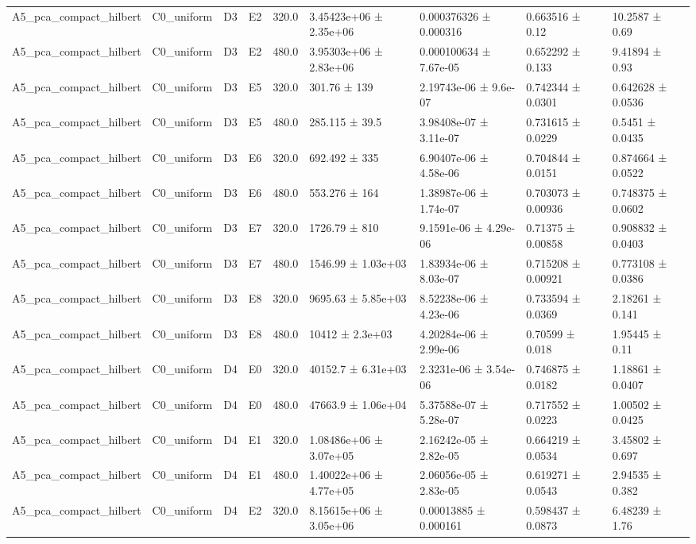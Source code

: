 \begin{table}
\begin{tabular}{lllllllll}
A5\_pca\_compact\_hilbert & C0\_uniform & D3 & E2 & 320.0 & 3.45423e+06 ± 2.35e+06 & 0.000376326 ± 0.000316 & 0.663516 ± 0.12 & 10.2587 ± 0.69 \\
A5\_pca\_compact\_hilbert & C0\_uniform & D3 & E2 & 480.0 & 3.95303e+06 ± 2.83e+06 & 0.000100634 ± 7.67e-05 & 0.652292 ± 0.133 & 9.41894 ± 0.93 \\
A5\_pca\_compact\_hilbert & C0\_uniform & D3 & E5 & 320.0 & 301.76 ± 139 & 2.19743e-06 ± 9.6e-07 & 0.742344 ± 0.0301 & 0.642628 ± 0.0536 \\
A5\_pca\_compact\_hilbert & C0\_uniform & D3 & E5 & 480.0 & 285.115 ± 39.5 & 3.98408e-07 ± 3.11e-07 & 0.731615 ± 0.0229 & 0.5451 ± 0.0435 \\
A5\_pca\_compact\_hilbert & C0\_uniform & D3 & E6 & 320.0 & 692.492 ± 335 & 6.90407e-06 ± 4.58e-06 & 0.704844 ± 0.0151 & 0.874664 ± 0.0522 \\
A5\_pca\_compact\_hilbert & C0\_uniform & D3 & E6 & 480.0 & 553.276 ± 164 & 1.38987e-06 ± 1.74e-07 & 0.703073 ± 0.00936 & 0.748375 ± 0.0602 \\
A5\_pca\_compact\_hilbert & C0\_uniform & D3 & E7 & 320.0 & 1726.79 ± 810 & 9.1591e-06 ± 4.29e-06 & 0.71375 ± 0.00858 & 0.908832 ± 0.0403 \\
A5\_pca\_compact\_hilbert & C0\_uniform & D3 & E7 & 480.0 & 1546.99 ± 1.03e+03 & 1.83934e-06 ± 8.03e-07 & 0.715208 ± 0.00921 & 0.773108 ± 0.0386 \\
A5\_pca\_compact\_hilbert & C0\_uniform & D3 & E8 & 320.0 & 9695.63 ± 5.85e+03 & 8.52238e-06 ± 4.23e-06 & 0.733594 ± 0.0369 & 2.18261 ± 0.141 \\
A5\_pca\_compact\_hilbert & C0\_uniform & D3 & E8 & 480.0 & 10412 ± 2.3e+03 & 4.20284e-06 ± 2.99e-06 & 0.70599 ± 0.018 & 1.95445 ± 0.11 \\
A5\_pca\_compact\_hilbert & C0\_uniform & D4 & E0 & 320.0 & 40152.7 ± 6.31e+03 & 2.3231e-06 ± 3.54e-06 & 0.746875 ± 0.0182 & 1.18861 ± 0.0407 \\
A5\_pca\_compact\_hilbert & C0\_uniform & D4 & E0 & 480.0 & 47663.9 ± 1.06e+04 & 5.37588e-07 ± 5.28e-07 & 0.717552 ± 0.0223 & 1.00502 ± 0.0425 \\
A5\_pca\_compact\_hilbert & C0\_uniform & D4 & E1 & 320.0 & 1.08486e+06 ± 3.07e+05 & 2.16242e-05 ± 2.82e-05 & 0.664219 ± 0.0534 & 3.45802 ± 0.697 \\
A5\_pca\_compact\_hilbert & C0\_uniform & D4 & E1 & 480.0 & 1.40022e+06 ± 4.77e+05 & 2.06056e-05 ± 2.83e-05 & 0.619271 ± 0.0543 & 2.94535 ± 0.382 \\
A5\_pca\_compact\_hilbert & C0\_uniform & D4 & E2 & 320.0 & 8.15615e+06 ± 3.05e+06 & 0.00013885 ± 0.000161 & 0.598437 ± 0.0873 & 6.48239 ± 1.76 \\

\end{tabular}
\end{table}
